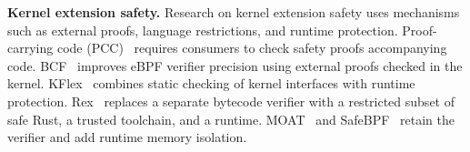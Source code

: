 \noindent\textbf{Kernel extension safety.} Research on kernel extension safety uses mechanisms such as external proofs, language restrictions, and runtime protection. Proof-carrying code (PCC)~\cite{necula1997pcc} requires consumers to check safety proofs accompanying code. BCF~\cite{sun2025prove} improves eBPF verifier precision using external proofs checked in the kernel. KFlex~\cite{dwivedi2024fast} combines static checking of kernel interfaces with runtime protection. Rex~\cite{jia2025rex} replaces a separate bytecode verifier with a restricted subset of safe Rust, a trusted toolchain, and a runtime. MOAT~\cite{lu2024moat} and SafeBPF~\cite{soo2024safebpf} retain the verifier and add runtime memory isolation.